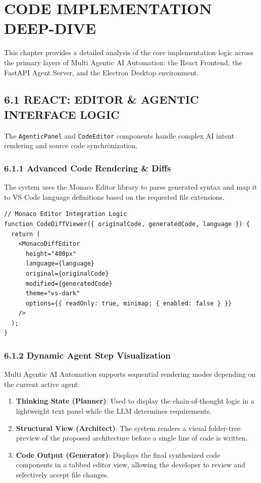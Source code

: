 \documentclass[
  12pt,
]{article}
\providecommand{\tightlist}{%
  \setlength{\itemsep}{0pt}\setlength{\parskip}{0pt}}
\begin{document}
\section{CODE IMPLEMENTATION
DEEP-DIVE}\label{code-implementation-deep-dive}

This chapter provides a detailed analysis of the core implementation
logic across the primary layers of Multi Agentic AI Automation: the
React Frontend, the FastAPI Agent Server, and the Electron Desktop
environment.

\subsection{6.1 REACT: EDITOR \& AGENTIC INTERFACE
LOGIC}\label{react-editor-agentic-interface-logic}

The \texttt{AgenticPanel} and \texttt{CodeEditor} components handle
complex AI intent rendering and source code synchronization.

\subsubsection{6.1.1 Advanced Code Rendering \&
Diffs}\label{advanced-code-rendering-diffs}

The system uses the Monaco Editor library to parse generated syntax and
map it to VS Code language definitions based on the requested file
extensions.

\begin{verbatim}
// Monaco Editor Integration Logic
function CodeDiffViewer({ originalCode, generatedCode, language }) {
  return (
    <MonacoDiffEditor
      height="400px"
      language={language}
      original={originalCode}
      modified={generatedCode}
      theme="vs-dark"
      options={{ readOnly: true, minimap: { enabled: false } }}
    />
  );
}
\end{verbatim}

\subsubsection{6.1.2 Dynamic Agent Step
Visualization}\label{dynamic-agent-step-visualization}

Multi Agentic AI Automation supports sequential rendering modes
depending on the current active agent:

\begin{enumerate}
\def\labelenumi{\arabic{enumi}.}
\tightlist
\item
  \textbf{Thinking State (Planner)}: Used to display the
  chain-of-thought logic in a lightweight text panel while the LLM
  determines requirements.
\item
  \textbf{Structural View (Architect)}: The system renders a visual
  folder-tree preview of the proposed architecture before a single line
  of code is written.
\item
  \textbf{Code Output (Generator)}: Displays the final synthesized code
  components in a tabbed editor view, allowing the developer to review
  and selectively accept file changes.
\end{enumerate}
\end{document}
